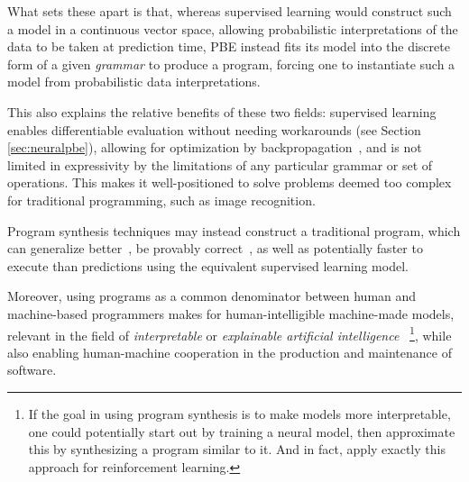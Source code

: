 \documentclass{article}
\begin{document}
What sets these apart is that,
whereas supervised learning would construct such a model in a continuous vector space,
allowing probabilistic interpretations of the data to be taken at prediction time,
PBE instead fits its model into the discrete form of a given \emph{grammar} to produce a program,
forcing one to instantiate such a model from probabilistic data interpretations.

This also explains the relative benefits of these two fields:
supervised learning enables differentiable evaluation
without needing workarounds (see Section \ref{sec:neuralpbe}),
allowing for optimization by backpropagation~\citep{backproprnn},
and is not limited in expressivity by the limitations of any particular grammar or set of operations.
This makes it well-positioned to solve problems deemed too complex for traditional programming, such as image recognition.

Program synthesis techniques may instead construct a traditional program,
which
can generalize better~\citep{nps}, be provably correct~\citep{nps},
as well as potentially faster to execute than predictions using the equivalent supervised learning model.

Moreover, using programs as a common denominator between human and machine-based programmers makes for human-intelligible machine-made models,
relevant in the field of \emph{interpretable} or \emph{explainable artificial intelligence}
~\footnote{
    If the goal in using program synthesis is to make models more interpretable,
    one could potentially start out by training a neural model,
    then approximate this by synthesizing a program similar to it.
    And in fact, \citet{pirl} apply exactly this approach for reinforcement learning.
},
while also enabling human-machine cooperation in the production and maintenance of software.

\end{document}
